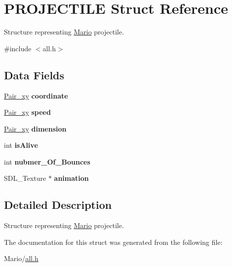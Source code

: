 \hypertarget{struct_p_r_o_j_e_c_t_i_l_e}{}\section{P\+R\+O\+J\+E\+C\+T\+I\+LE Struct Reference}
\label{struct_p_r_o_j_e_c_t_i_l_e}


Structure representing \mbox{\hyperlink{struct_mario}{Mario}} projectile.  




{\ttfamily \#include $<$all.\+h$>$}

\subsection*{Data Fields}
\begin{DoxyCompactItemize}
\item 
\mbox{\label{struct_p_r_o_j_e_c_t_i_l_e_a6cf77a9254df5cfd669084e0a97d9711}} 
\mbox{\hyperlink{all_8h_a9a35f73dcc6cf9a466e6542847bd8882}{Pair\+\_\+xy}} {\bfseries coordinate}
\item 
\mbox{\label{struct_p_r_o_j_e_c_t_i_l_e_a17e25b2ef4c597ac58da845ec3bce5c6}} 
\mbox{\hyperlink{all_8h_a9a35f73dcc6cf9a466e6542847bd8882}{Pair\+\_\+xy}} {\bfseries speed}
\item 
\mbox{\label{struct_p_r_o_j_e_c_t_i_l_e_a0da7d680eb31a67eac3371518ae0a6cb}} 
\mbox{\hyperlink{all_8h_a9a35f73dcc6cf9a466e6542847bd8882}{Pair\+\_\+xy}} {\bfseries dimension}
\item 
\mbox{\label{struct_p_r_o_j_e_c_t_i_l_e_a116ae74d5b3df6d48cdb0f3a6bb36a07}} 
int {\bfseries is\+Alive}
\item 
\mbox{\label{struct_p_r_o_j_e_c_t_i_l_e_a51798842b3515bb6405d0f403a9f782f}} 
int {\bfseries nubmer\+\_\+\+Of\+\_\+\+Bounces}
\item 
\mbox{\label{struct_p_r_o_j_e_c_t_i_l_e_a15c618ec6bff31ac32dba21208442152}} 
S\+D\+L\+\_\+\+Texture $\ast$ {\bfseries animation}
\end{DoxyCompactItemize}


\subsection{Detailed Description}
Structure representing \mbox{\hyperlink{struct_mario}{Mario}} projectile. 

The documentation for this struct was generated from the following file\+:\begin{DoxyCompactItemize}
\item 
Mario/\mbox{\hyperlink{all_8h}{all.\+h}}\end{DoxyCompactItemize}

